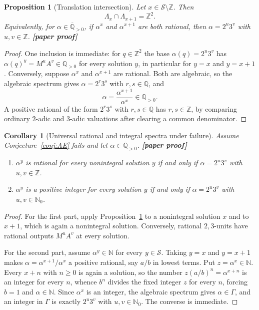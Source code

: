 \documentclass[11pt,oneside]{article}
\newtheorem{proposition}[theorem]{Proposition}
\newtheorem{corollary}[theorem]{Corollary}
\theoremstyle{definition}
\theoremstyle{remark}
\newcommand{\N}{\mathbb N}
\newcommand{\Nzero}{\mathbb N_0}
\newcommand{\Z}{\mathbb Z}
\newcommand{\Q}{\mathbb Q}
\newcommand{\Abar}{\overline{\mathbb Q}}
\newcommand{\Sol}{\mathcal S}
\newcommand{\Apos}{\Abar_{>0}}
\newcommand{\GammaSat}{\Gamma}
\newcommand{\statusnew}{\textcolor{newgreen}{\textbf{[paper proof]}}}
\begin{document}
\begin{proposition}[Translation intersection]
\label{vl:prop-translation}
Let $x\in\Sol\setminus\Z$.  Then
\[
  \Lambda_x\cap\Lambda_{x+1}=\Z^2 .
\]
Equivalently, for $\alpha\in\Apos$, if $\alpha^x$ and $\alpha^{x+1}$ are both rational, then
$\alpha=2^u3^v$ with $u,v\in\Z$.  \statusnew
\end{proposition}

\begin{proof}
One inclusion is immediate: for $q\in\Z^2$ the base $\alpha(q)=2^u3^v$ has
$\alpha(q)^y=M^uA^v\in\Q_{>0}$ for every solution $y$, in particular for $y=x$ and $y=x+1$.
Conversely, suppose $\alpha^x$ and $\alpha^{x+1}$ are rational.  Both are algebraic, so the
algebraic spectrum gives $\alpha=2^r3^s$ with $r,s\in\Q$, and
\[
  \alpha=\frac{\alpha^{x+1}}{\alpha^x}\in\Q_{>0}.
\]
A positive rational of the form $2^r3^s$ with $r,s\in\Q$ has $r,s\in\Z$, by comparing ordinary
$2$-adic and $3$-adic valuations after clearing a common denominator.
\end{proof}

\begin{corollary}[Universal rational and integral spectra under failure]
\label{vl:cor-universal}
Assume Conjecture~\ref{conj:AE} fails and let $\alpha\in\Apos$.  \statusnew
\begin{enumerate}
\item $\alpha^y$ is rational for every nonintegral solution $y$ if and only if
      $\alpha=2^u3^v$ with $u,v\in\Z$.
\item $\alpha^y$ is a positive integer for every solution $y$ if and only if
      $\alpha=2^u3^v$ with $u,v\in\Nzero$.
\end{enumerate}
\end{corollary}

\begin{proof}
For the first part, apply Proposition~\ref{vl:prop-translation} to a nonintegral solution $x$
and to $x+1$, which is again a nonintegral solution.  Conversely, rational $2,3$-units have
rational outputs $M^uA^v$ at every solution.

For the second part, assume $\alpha^y\in\N$ for every $y\in\Sol$.  Taking $y=x$ and $y=x+1$
makes $\alpha=\alpha^{x+1}/\alpha^x$ a positive rational, say $a/b$ in lowest terms.  Put
$z=\alpha^x\in\N$.  Every $x+n$ with $n\ge0$ is again a solution, so the number
$z(a/b)^n=\alpha^{x+n}$ is an integer for every $n$, whence
$b^n$ divides the fixed integer $z$ for every $n$, forcing $b=1$ and $\alpha\in\N$.  Since
$\alpha^x$ is an integer, the algebraic spectrum gives $\alpha\in\GammaSat$, and an integer in
$\GammaSat$ is exactly $2^u3^v$ with $u,v\in\Nzero$.  The converse is immediate.
\end{proof}
\end{document}
